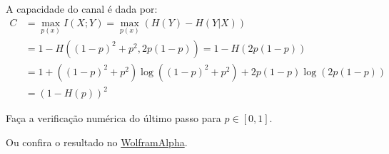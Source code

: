 \begin{questions}
\begin{solution}
A capacidade do canal é dada por:
\begin{align}
C &= \max_{p(x)} I(X;Y) = \max_{p(x)} \left( H(Y) - H(Y|X) \right) \nonumber \\
  &= 1 - H\left( (1-p)^2 + p^2, 2p (1-p) \right) = 1 - H\left( 2p (1-p) \right) \nonumber \\
  &= 1 + \left((1-p)^2 + p^2\right) \log \left( (1-p)^2+p^2 \right) + 2p (1-p) \log \left( 2p(1-p) \right) \nonumber \\
  &= \left(1 - H(p)\right)^2
\end{align}

Faça a verificação numérica do último passo para $p \in [0,1]$.

Ou confira o resultado no \href{https://www.wolframalpha.com/input/?i=1+%2B+%28%281-p%29%5E2%2Bp%5E2%29+%5Clog+%28%281-p%29%5E2%2Bp%5E2%29+%2B+2p%281-p%29+%5Clog%282p%281-p%29%29++-+%281+%2B+p+%5Clog+p+%2B+%281-p%29%5Clog+%281-p%29%29%5E2}{WolframAlpha}.


\end{solution}
\end{questions}
